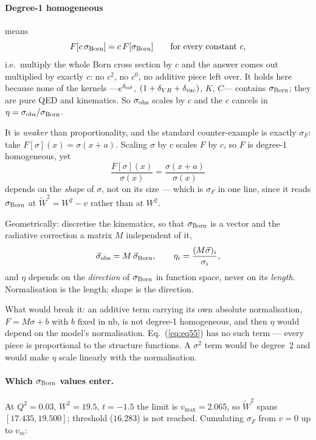 \documentclass[11pt]{article}
\begin{document}
\paragraph{Degree-1 homogeneous} means
\begin{equation}
F[c\,\sigma_{\rm Born}]=c\,F[\sigma_{\rm Born}]\qquad\text{for every constant }c,
\end{equation}
i.e.\ multiply the whole Born cross section by $c$ and the answer comes out multiplied by exactly
$c$: no $c^2$, no $c^0$, no additive piece left over. It holds here because none of the kernels
---$e^{\delta_{\rm inf}}$, $(1+\delta_{VR}+\delta_{\rm vac})$, $K$, $C$--- contains
$\sigma_{\rm Born}$; they are pure QED and kinematics. So $\sigma_{\rm obs}$ scales by $c$ and the
$c$ cancels in $\eta=\sigma_{\rm obs}/\sigma_{\rm Born}$.

It is \emph{weaker} than proportionality, and the standard counter-example is exactly $\sigma_F$:
take $F[\sigma](x)=\sigma(x+a)$. Scaling $\sigma$ by $c$ scales $F$ by $c$, so $F$ is degree-1
homogeneous, yet
\begin{equation}
\frac{F[\sigma](x)}{\sigma(x)}=\frac{\sigma(x+a)}{\sigma(x)}
\end{equation}
depends on the \emph{shape} of $\sigma$, not on its size --- which is $\sigma_F$ in one line, since it
reads $\sigma_{\rm Born}$ at $\tilde W^2=W^2-v$ rather than at $W^2$.

Geometrically: discretise the kinematics, so that $\sigma_{\rm Born}$ is a vector and the radiative
correction a matrix $M$ independent of it,
\begin{equation}
\vec\sigma_{\rm obs}=M\,\vec\sigma_{\rm Born},
\qquad
\eta_i=\frac{(M\vec\sigma)_i}{\sigma_i},
\end{equation}
and $\eta$ depends on the \emph{direction} of $\sigma_{\rm Born}$ in function space, never on its
\emph{length}. Normalisation is the length; shape is the direction.

What would break it: an additive term carrying its own absolute normalisation, $F=M\sigma+b$ with $b$
fixed in nb, is not degree-1 homogeneous, and then $\eta$ would depend on the model's normalisation.
Eq.~(\ref{eq:eq55}) has no such term --- every piece is proportional to the structure functions. A
$\sigma^2$ term would be degree~2 and would make $\eta$ scale linearly with the normalisation.

\paragraph{Which $\sigma_{\rm Born}$ values enter.} At $Q^2=0.03$, $W^2=19.5$, $t=-1.5$ the limit is
$v_{\max}=2.065$, so $\tilde W^2$ spans $[17.435,19.500]$; threshold ($16.283$) is not reached.
Cumulating $\sigma_F$ from $v=0$ up to $v_m$:
\end{document}
